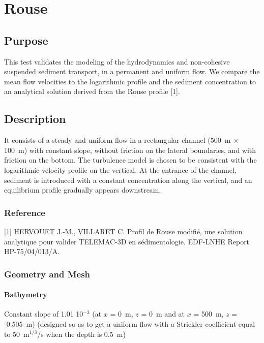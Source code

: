 \chapter{Rouse}
%
%
\section{Purpose}
%
This test validates the modeling of the hydrodynamics and non-cohesive
suspended sediment transport, in a permanent and uniform flow.
We compare the mean flow velocities to the logarithmic profile and the
sediment concentration to an analytical solution derived from the Rouse
profile [1].
%
\section{Description}
%
It consists of a steady and uniform flow in a rectangular channel
(500~m $\times$ 100~m) with constant slope, without friction on the
lateral boundaries, and with friction on the bottom.
The turbulence model is chosen to be consistent with the logarithmic
velocity profile on the vertical.
At the entrance of the channel, sediment is introduced with a constant
concentration along the vertical, and an equilibrium profile gradually
appears downstream.
%
%
%
%
\subsection{Reference}
%
[1] HERVOUET J.-M., VILLARET C. Profil de Rouse modifié, une solution
analytique pour valider TELEMAC-3D en sédimentologie.
EDF-LNHE Report HP-75/04/013/A.
%
%
%
\subsection{Geometry and Mesh}
%
\subsubsection{Bathymetry}
%
Constant slope of 1.01 10$^{-3}$ (at $x$ = 0~m, $z$ = 0~m and at
$x$ = 500~m, $z$ = -0.505~m)
(designed so as to get a uniform flow with a Strickler coefficient equal
to 50~m$^{1/3}$/s when the depth is 0.5~m)
%
